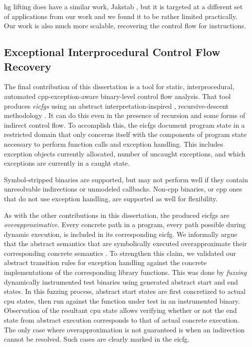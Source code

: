 \Ac{hg} lifting does have a similar work, Jakstab \autocite{kinder2010static,kinder2012alternating,kinder2012virtualization}, but it is targeted at a different set of applications from our work and we found it to be rather limited practically.
Our work is also much more scalable, recovering the control flow for  instructions.

\subsection{Exceptional Interprocedural Control Flow Recovery}
The final contribution of this dissertation is a tool for static, interprocedural, automated \gls{cpp}-exception-aware%
 
binary-level control flow analysis.
That tool produces \emph{\acp{eicfg}} using an abstract interpretation-inspired , recursive-descent methodology .
It can do this even in the presence of recursion and some forms of indirect control flow.
To accomplish this, the \acp{eicfg} document program state in a restricted domain that only concerns itself with the components of program state necessary to perform function calls and exception handling.
This includes exception objects currently allocated, number of uncaught exceptions, and which exceptions are currently in a caught state.

Symbol-stripped binaries are supported, but may not perform well if they contain unresolvable indirections or unmodeled callbacks.
Non-\gls{cpp} binaries, or \gls{cpp} ones that do not use exception handling, are supported as well for flexibility.

As with the other contributions in this dissertation, the produced \acp{eicfg} are \emph{overapproximative}.
Every concrete path in a program, every path possible during dynamic execution, is included in its corresponding \ac{eicfg}.
We informally argue that the abstract semantics that are symbolically executed overapproximate their corresponding concrete semantics \autocite{cousot1996abstract}.
To strengthen this claim, we validated our abstract transition rules for exception handling against the concrete implementations of the corresponding library functions.
This was done by \emph{fuzzing} dynamically instrumented test binaries using generated abstract start and end states.
In this fuzzing process, abstract start states are first concretized to actual \ac{cpu} states, then run against the function under test in an instrumented binary.
Observation of the resultant \ac{cpu} state allows verifying whether or not the end state from abstract execution corresponds to that of actual concrete execution.
The only case where overapproximation is not guaranteed is when an indirection cannot be resolved.
Such cases are clearly marked in the \ac{eicfg}.

